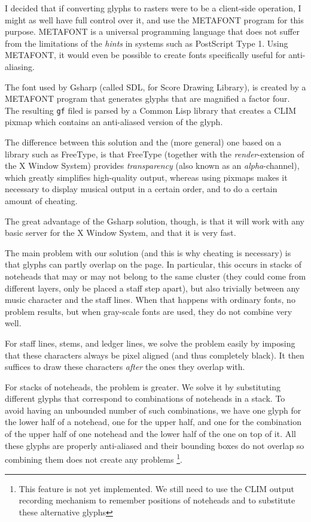 \documentclass[11pt]{book}
\def\commonlisp{Common Lisp}
\def\gs{Gsharp}
\def\clim{CLIM}
\def\xwin{the X Window System}
\def\freetype{FreeType}
\def\metafont{METAFONT}
\def\unimp#1{\footnote{This feature is not yet implemented.  #1}}
\begin{document}
I decided that if converting glyphs to rasters were to be a
client-side operation, I might as well have full control over it, and
use the {\metafont} program for this purpose.  {\metafont} is a
universal programming language that does not suffer from the
limitations of the \emph{hints} in systems such as
PostScript Type 1.  Using {\metafont}, it would even be possible to
create fonts specifically useful for anti-aliasing.

The font used by {\gs} (called SDL, for Score Drawing Library), is
created by a {\metafont} program that generates glyphs that are
magnified a factor four.  The resulting \texttt{gf} filed is parsed by
a {\commonlisp} library that creates a {\clim} pixmap which contains an
anti-aliased version of the glyph.  

The difference between this solution and the (more general) one based
on a library such as {\freetype}, is that {\freetype} (together with
the \emph{render}-extension of {\xwin}) provides \emph{transparency}
(also known as an \emph{alpha}-channel), which greatly simplifies
high-quality output, whereas using pixmaps makes it necessary to
display musical output in a certain order, and to do a certain amount
of cheating.

The great advantage of the {\gs} solution, though, is that it will
work with any basic server for {\xwin}, and that it is very fast. 

The main problem with our solution (and this is why cheating is
necessary) is that glyphs can partly overlap on the page.  In
particular, this occurs in stacks of noteheads that may or may not
belong to the same cluster (they could come from different layers,
only be placed a staff step apart), but also trivially between any
music character and the staff lines.  When that happens with ordinary
fonts, no problem results, but when gray-scale fonts are used, they do
not combine very well.  

For staff lines, stems, and ledger lines, we solve the problem easily
by imposing that these characters always be pixel aligned (and thus
completely black).  It then suffices to draw these characters
\emph{after} the ones they overlap with.  

For stacks of noteheads, the problem is greater.  We solve it by
substituting different glyphs that correspond to combinations of
noteheads in a stack.  To avoid having an unbounded number of such
combinations, we have one glyph for the lower half of a notehead, one
for the upper half, and one for the combination of the upper half of
one notehead and the lower half of the one on top of it.  All these
glyphs are properly anti-aliased and their bounding boxes do not
overlap so combining them does not create any problems \unimp{We still
need to use the {\clim} output recording mechanism to remember
positions of noteheads and to substitute these alternative glyphs}. 
\end{document}

